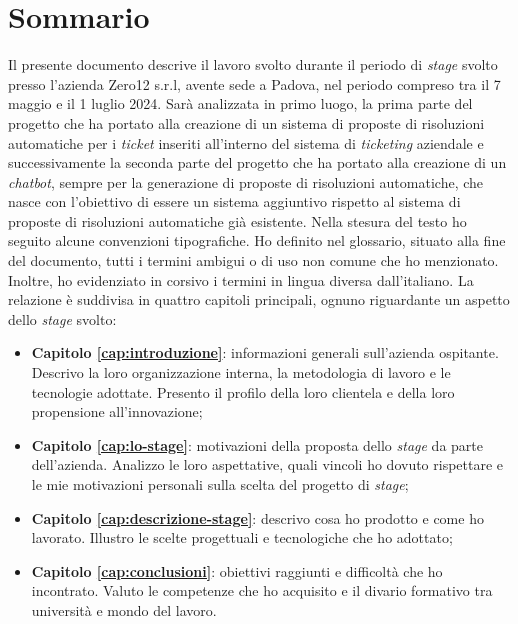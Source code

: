 \cleardoublepage
{}
{}
\begingroup
\let\clearpage\relax
\let\cleardoublepage\relax
\let\cleardoublepage\relax
\chapter*{Sommario}
Il presente documento descrive il lavoro svolto durante il periodo di \textit{stage} svolto presso l'azienda Zero12 s.r.l, avente sede a Padova, nel periodo compreso tra il 7 maggio e il 1 luglio 2024.
Sarà analizzata in primo luogo, la prima parte del progetto che ha portato alla creazione di un sistema di proposte di risoluzioni automatiche per i \textit{ticket} inseriti all'interno del sistema di \textit{ticketing} aziendale e successivamente
la seconda parte del progetto che ha portato alla creazione di un \textit{chatbot}, sempre per la generazione di proposte di risoluzioni automatiche, che nasce con l'obiettivo di essere un sistema aggiuntivo rispetto al sistema di proposte di risoluzioni automatiche già esistente.
Nella stesura del testo ho seguito alcune convenzioni tipografiche. Ho definito nel glossario, situato alla fine del documento, tutti i termini ambigui o di uso non comune che ho menzionato. Inoltre, ho evidenziato in corsivo i termini in lingua diversa dall’italiano.
La relazione è suddivisa in quattro capitoli principali, ognuno riguardante un aspetto dello \textit{stage} svolto: 
\begin{itemize}
    \item \textbf{Capitolo \ref{cap:introduzione}}: informazioni generali sull'azienda ospitante. Descrivo la loro organizzazione interna, la metodologia di lavoro e le tecnologie adottate. Presento il profilo della loro clientela e della loro propensione all'innovazione;
    \item \textbf{Capitolo \ref{cap:lo-stage}}: motivazioni della proposta dello \textit{stage} da parte dell'azienda. Analizzo le loro aspettative, quali vincoli ho dovuto rispettare e le mie motivazioni personali sulla scelta del progetto di \textit{stage};
    \item \textbf{Capitolo \ref{cap:descrizione-stage}}: descrivo cosa ho prodotto e come ho lavorato. Illustro le scelte progettuali e tecnologiche che ho adottato;
    \item \textbf{Capitolo \ref{cap:conclusioni}}: obiettivi raggiunti e difficoltà che ho incontrato. Valuto le competenze che ho acquisito e il divario formativo tra università e mondo del lavoro.
\end{itemize}




\endgroup

\vfill
